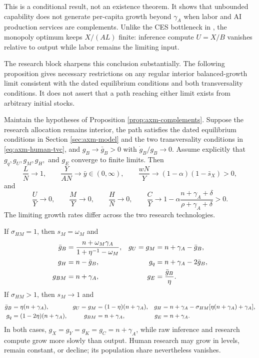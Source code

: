 This is a conditional result, not an existence theorem. It shows that unbounded
capability does not generate per-capita growth beyond \(\gamma_A\) when labor
and AI production services are complements. Unlike the CES bottleneck in
\citet{davidsonetal2026}, the monopoly
optimum keeps \(X/(AL)\) finite: inference compute \(U=X/B\) vanishes relative to
output while labor remains the limiting input.

The research block sharpens this conclusion substantially. The following
proposition gives necessary restrictions on any regular interior
balanced-growth limit consistent with the dated equilibrium conditions and both
transversality conditions. It does not assert that a path reaching either limit
exists from arbitrary initial stocks.

\begin{proposition}
\label{prop:axm-complements-research}
Maintain the hypotheses of Proposition \ref{prop:axm-complements}. Suppose the
research allocation remains interior, the path satisfies the dated equilibrium
conditions in Section \ref{sec:axm-model} and the two transversality conditions
in \eqref{eq:axm-human-tvc}, and
\(g_B\to\bar g_B>0\) with \(\dot g_B/g_B\to0\). Assume explicitly that
\(g_q,g_U,g_M,g_H,\) and \(g_E\) converge to finite limits. Then
\begin{equation}
 \frac{L}{N}\to1,\qquad
 \frac{Y}{AN}\to\bar y\in(0,\infty),\qquad
 \frac{wN}{Y}\to(1-\alpha)(1-\bar s_X)>0,
 \label{eq:axm-complement-labor-limits}
\end{equation}
and
\begin{equation}
 \frac{U}{Y}\to0,\qquad
 \frac{M}{Y}\to0,\qquad
 \frac{H}{N}\to0,\qquad
 \frac{C}{Y}\to
 1-\alpha\frac{n+\gamma_A+\delta}
 {\rho+\gamma_A+\delta}>0.
 \label{eq:axm-complement-vanishing-shares}
\end{equation}
The limiting growth rates differ across the two research technologies.

If \(\sigma_{HM}=1\), then \(s_M=\omega_M\) and
\begin{align}
 \bar g_B&=\frac{n+\omega_M\gamma_A}
 {1+\eta^{-1}-\omega_M},
 &g_U=g_M&=n+\gamma_A-\bar g_B,
 \label{eq:axm-complement-cd-research-growth}\\
 g_H&=n-\bar g_B,
 &g_q&=n+\gamma_A-2\bar g_B,\notag\\
 g_{BM}&=n+\gamma_A,
 &g_E&=\frac{\bar g_B}{\eta}.
 \notag
\end{align}
If \(\sigma_{HM}>1\), then \(s_M\to1\) and
\begin{align}
 \bar g_B&=\eta(n+\gamma_A),
 &g_U=g_M&=(1-\eta)(n+\gamma_A),
 &g_H&=n+\gamma_A
 -\sigma_{HM}[\eta(n+\gamma_A)+\gamma_A],
 \label{eq:axm-complement-ces-research-growth}\\
 g_q&=(1-2\eta)(n+\gamma_A),
 &g_{BM}&=n+\gamma_A,
 &g_E&=n+\gamma_A.
 \notag
\end{align}
In both cases, \(g_X=g_Y=g_K=g_C=n+\gamma_A\), while raw inference and research
compute grow more slowly than output. Human research may grow in levels, remain
constant, or decline; its population share nevertheless vanishes.


\end{proposition}
